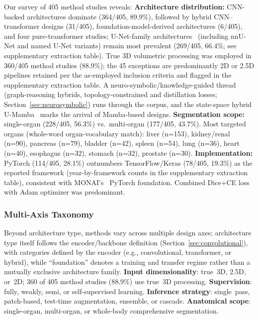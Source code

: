 Our survey of 405 method studies reveals: \textbf{Architecture distribution:} CNN-backed architectures dominate (364/405, 89.9\%), followed by hybrid CNN--transformer designs (31/405), foundation-model-derived architectures (6/405), and four pure-transformer studies; U-Net-family architectures~\cite{cicek20163dunet} (including nnU-Net and named U-Net variants) remain most prevalent (269/405, 66.4\%; see supplementary extraction table). True 3D volumetric processing was employed in 360/405 method studies (88.9\%); the 45 exceptions are predominantly 2D or 2.5D pipelines retained per the as-employed inclusion criteria and flagged in the supplementary extraction table. A neuro-symbolic/knowledge-guided thread (graph-reasoning hybrids, topology-constrained and distillation losses; Section~\ref{sec:neurosymbolic}) runs through the corpus, and the state-space hybrid U-Mamba~\cite{jun2024umamba} marks the arrival of Mamba-based designs. \textbf{Segmentation scope:} single-organ (228/405, 56.3\%) vs.\ multi-organ (177/405, 43.7\%). Most targeted organs (whole-word organ-vocabulary match): liver (n=153), kidney/renal (n=90), pancreas (n=79), bladder (n=42), spleen (n=54), lung (n=36), heart (n=40), esophagus (n=32), stomach (n=32), prostate (n=30). \textbf{Implementation:} PyTorch (114/405, 28.1\%) outnumbers TensorFlow/Keras (78/405, 19.3\%) as the reported framework (year-by-framework counts in the supplementary extraction table), consistent with MONAI's~\cite{monai2022} PyTorch foundation. Combined Dice+CE loss with Adam optimizer was predominant.

\subsubsection{Multi-Axis Taxonomy}

Beyond architecture type, methods vary across multiple design axes; architecture type itself follows the encoder/backbone definition (Section~\ref{sec:convolutional}), with categories defined by the encoder (e.g., convolutional, transformer, or hybrid), while ``foundation'' denotes a training and transfer regime rather than a mutually exclusive architecture family. \textbf{Input dimensionality}: true~3D, 2.5D, or~2D; 360 of 405 method studies (88.9\%) use true~3D processing. \textbf{Supervision}: fully, weakly, semi, or self-supervised learning. \textbf{Inference strategy}: single~pass, patch-based, test-time augmentation, ensemble, or cascade. \textbf{Anatomical scope}: single-organ, multi-organ, or whole-body comprehensive segmentation.

